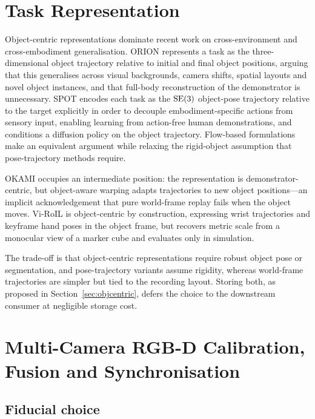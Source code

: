 \section{Task Representation}
\label{sec:lit-repr}

Object-centric representations dominate recent work on cross-environment and
cross-embodiment generalisation. ORION \cite{orion} represents a task as the
three-dimensional object trajectory relative to initial and final object
positions, arguing that this generalises across visual backgrounds, camera
shifts, spatial layouts and novel object instances, and that full-body
reconstruction of the demonstrator is unnecessary. SPOT \cite{spot} encodes each
task as the $\mathrm{SE}(3)$ object-pose trajectory relative to the target explicitly in
order to decouple embodiment-specific actions from sensory input, enabling
learning from action-free human demonstrations, and conditions a diffusion
policy on the object trajectory. Flow-based formulations \cite{novaflow} make an
equivalent argument while relaxing the rigid-object assumption that
pose-trajectory methods require.

OKAMI \cite{okami} occupies an intermediate position: the representation is
demonstrator-centric, but object-aware warping adapts trajectories to new object
positions---an implicit acknowledgement that pure world-frame replay fails when
the object moves. Vi-RoIL \cite{viroil} is object-centric by construction,
expressing wrist trajectories and keyframe hand poses in the object frame, but
recovers metric scale from a monocular view of a marker cube and evaluates only
in simulation.

The trade-off is that object-centric representations require robust object pose
or segmentation, and pose-trajectory variants assume rigidity, whereas
world-frame trajectories are simpler but tied to the recording layout. Storing
both, as proposed in Section~\ref{sec:objcentric}, defers the choice to the
downstream consumer at negligible storage cost.

\section{Multi-Camera RGB-D Calibration, Fusion and Synchronisation}
\label{sec:lit-calib}

\subsection{Fiducial choice}

